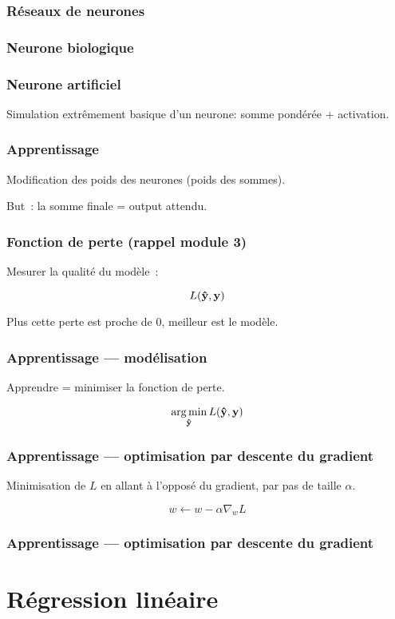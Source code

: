 \documentclass{formation}
\begin{document}
\begin{frame}
  \frametitle{Réseaux de neurones}
\end{frame}

\begin{frame}
  \frametitle{Neurone biologique}
\end{frame}

\begin{frame}
  \frametitle{Neurone artificiel}
  Simulation extrêmement basique d'un neurone: somme pondérée +
  activation.
\end{frame}

\begin{frame}
  \frametitle{Apprentissage}
  Modification des poids des neurones (poids des sommes).

  But : la somme finale = output attendu.
\end{frame}

\begin{frame}
  \frametitle{Fonction de perte (rappel module 3)}

  Mesurer la qualité du modèle :

  \[
    L(\vect{\hat{y}}, \vect{y})
  \]

  Plus cette perte est proche de 0, meilleur est le modèle.
\end{frame}


\begin{frame}
  \frametitle{Apprentissage --- modélisation}
  Apprendre = minimiser la fonction de perte.

  \[
    \argmin_{\vect{\hat{y}}}L(\vect{\hat{y}}, \vect{y})
  \]
\end{frame}

\begin{frame}
  \frametitle{Apprentissage --- optimisation par descente du gradient}
  Minimisation de $L$ en allant à l'opposé du gradient, par pas de
  taille $\alpha$.

  \[
    w \leftarrow w - \alpha \nabla_wL
  \]
  
\end{frame}

\begin{frame}
  \frametitle{Apprentissage --- optimisation par descente du gradient}

\end{frame}

\section{Régression linéaire}
\end{document}
